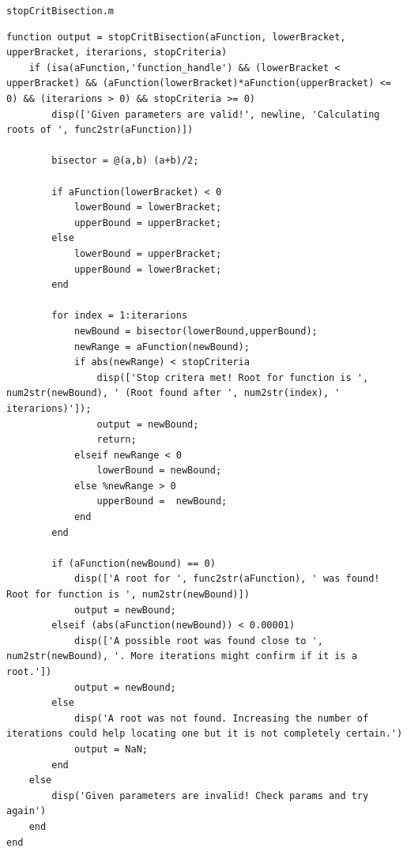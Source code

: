 \documentclass[english,notitlepage,letterpaper, 10pt]{article} %
\begin{document}
\texttt{stopCritBisection.m}
\begin{lstlisting}
function output = stopCritBisection(aFunction, lowerBracket, upperBracket, iterarions, stopCriteria)
    if (isa(aFunction,'function_handle') && (lowerBracket < upperBracket) && (aFunction(lowerBracket)*aFunction(upperBracket) <= 0) && (iterarions > 0) && stopCriteria >= 0)
        disp(['Given parameters are valid!', newline, 'Calculating roots of ', func2str(aFunction)])

        bisector = @(a,b) (a+b)/2;
        
        if aFunction(lowerBracket) < 0
            lowerBound = lowerBracket;
            upperBound = upperBracket;
        else
            lowerBound = upperBracket;
            upperBound = lowerBracket;
        end
        
        for index = 1:iterarions
            newBound = bisector(lowerBound,upperBound);
            newRange = aFunction(newBound);
            if abs(newRange) < stopCriteria
                disp(['Stop critera met! Root for function is ', num2str(newBound), ' (Root found after ', num2str(index), ' iterarions)']);
                output = newBound;
                return;
            elseif newRange < 0
                lowerBound = newBound;
            else %newRange > 0
                upperBound =  newBound;
            end
        end

        if (aFunction(newBound) == 0)
            disp(['A root for ', func2str(aFunction), ' was found! Root for function is ', num2str(newBound)])
            output = newBound;
        elseif (abs(aFunction(newBound)) < 0.00001)
            disp(['A possible root was found close to ', num2str(newBound), '. More iterations might confirm if it is a root.'])
            output = newBound;
        else
            disp('A root was not found. Increasing the number of iterations could help locating one but it is not completely certain.')
            output = NaN;
        end
    else 
        disp('Given parameters are invalid! Check params and try again')
    end
end
\end{lstlisting}
\end{document}

